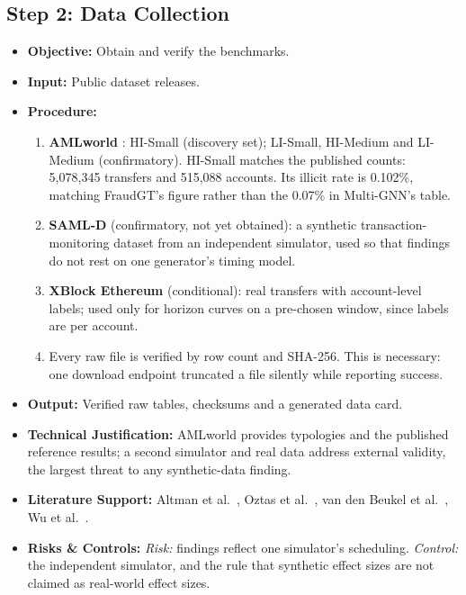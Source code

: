 \documentclass[11pt,a4paper]{article}
\begin{document}
\subsection{Step 2: Data Collection}
\begin{itemize}[leftmargin=*]
    \item \textbf{Objective:} Obtain and verify the benchmarks.
    \item \textbf{Input:} Public dataset releases.
    \item \textbf{Procedure:}
    \begin{enumerate}[leftmargin=*]
        \item \textbf{AMLworld} \cite{altman2023ibmaml}: HI-Small (discovery set); LI-Small, HI-Medium and LI-Medium (confirmatory). HI-Small matches the published counts: 5,078,345 transfers and 515,088 accounts. Its illicit rate is 0.102\%, matching FraudGT's figure rather than the 0.07\% in Multi-GNN's table.
        \item \textbf{SAML-D} \cite{oztas2023samld} (confirmatory, not yet obtained): a synthetic transaction-monitoring dataset from an independent simulator, used so that findings do not rest on one generator's timing model.
        \item \textbf{XBlock Ethereum} \cite{wu2022phishers} (conditional): real transfers with account-level labels; used only for horizon curves on a pre-chosen window, since labels are per account.
        \item Every raw file is verified by row count and SHA-256. This is necessary: one download endpoint truncated a file silently while reporting success.
    \end{enumerate}
    \item \textbf{Output:} Verified raw tables, checksums and a generated data card.
    \item \textbf{Technical Justification:} AMLworld provides typologies and the published reference results; a second simulator and real data address external validity, the largest threat to any synthetic-data finding.
    \item \textbf{Literature Support:} Altman et al.\ \cite{altman2023ibmaml}, Oztas et al.\ \cite{oztas2023samld}, van den Beukel et al.\ \cite{vandenbeukel2026tide}, Wu et al.\ \cite{wu2022phishers}.
    \item \textbf{Risks \& Controls:} \textit{Risk:} findings reflect one simulator's scheduling. \textit{Control:} the independent simulator, and the rule that synthetic effect sizes are not claimed as real-world effect sizes.
\end{itemize}
\end{document}
